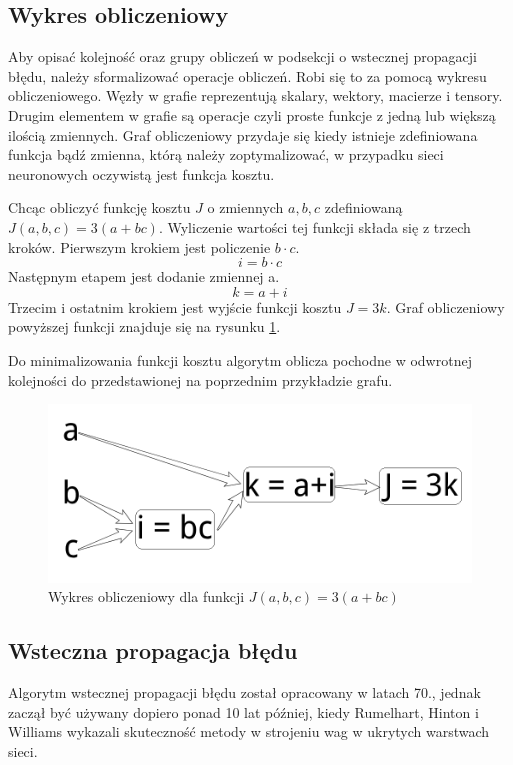 \documentclass[12pt,a4paper,twoside,titlepage,openright]{book}
\begin{document}
\subsection{Wykres obliczeniowy}
Aby opisać kolejność oraz grupy obliczeń w podsekcji o wstecznej propagacji błędu, należy sformalizować operacje obliczeń. Robi się to za pomocą wykresu obliczeniowego. Węzły w grafie reprezentują skalary, wektory, macierze i tensory. Drugim elementem w grafie są operacje czyli proste funkcje z jedną lub większą ilością zmiennych. Graf obliczeniowy przydaje się kiedy istnieje zdefiniowana funkcja bądź zmienna, którą należy zoptymalizować, w przypadku sieci neuronowych oczywistą jest funkcja kosztu.

Chcąc obliczyć funkcję kosztu \(J\) o zmiennych \(a,b,c\) zdefiniowaną \(J(a,b,c) = 3(a+bc)\). Wyliczenie wartości tej funkcji składa się z trzech kroków. Pierwszym krokiem jest policzenie \(b \cdot c\).
$$i = b \cdot c$$
Następnym etapem jest dodanie zmiennej a.
$$k = a + i$$
Trzecim i ostatnim krokiem jest wyjście funkcji kosztu \(J = 3k\).
Graf obliczeniowy powyższej funkcji znajduje się na rysunku \ref{fig:costFunction}.

Do minimalizowania funkcji kosztu algorytm oblicza pochodne w odwrotnej kolejności do przedstawionej na poprzednim przykładzie grafu.

\begin{figure}[ht]
	\centering
			\includegraphics[resolution=100, scale=0.4]{ComputationGraph.png}
		\caption{Wykres obliczeniowy dla funkcji \(J(a,b,c) = 3(a+bc)\)}
				\label{fig:costFunction}
\end{figure}

\subsection{Wsteczna propagacja błędu}
Algorytm wstecznej propagacji błędu został opracowany w latach 70., jednak zaczął być używany dopiero ponad 10 lat później, kiedy Rumelhart, Hinton i Williams wykazali skuteczność metody w strojeniu wag w ukrytych warstwach sieci.
\end{document}

